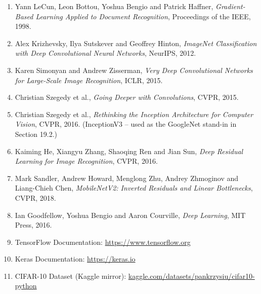 \documentclass[11pt]{article}
\begin{document}
\begin{enumerate}

\item Yann LeCun, Leon Bottou, Yoshua Bengio and Patrick Haffner,
\emph{Gradient-Based Learning Applied to Document Recognition},
Proceedings of the IEEE, 1998.

\item Alex Krizhevsky, Ilya Sutskever and Geoffrey Hinton,
\emph{ImageNet Classification with Deep Convolutional Neural Networks},
NeurIPS, 2012.

\item Karen Simonyan and Andrew Zisserman,
\emph{Very Deep Convolutional Networks for Large-Scale Image Recognition},
ICLR, 2015.

\item Christian Szegedy et al.,
\emph{Going Deeper with Convolutions},
CVPR, 2015.

\item Christian Szegedy et al.,
\emph{Rethinking the Inception Architecture for Computer Vision},
CVPR, 2016. (InceptionV3 -- used as the GoogleNet stand-in in Section 19.2.)

\item Kaiming He, Xiangyu Zhang, Shaoqing Ren and Jian Sun,
\emph{Deep Residual Learning for Image Recognition},
CVPR, 2016.

\item Mark Sandler, Andrew Howard, Menglong Zhu, Andrey Zhmoginov and
Liang-Chieh Chen,
\emph{MobileNetV2: Inverted Residuals and Linear Bottlenecks},
CVPR, 2018.

\item Ian Goodfellow, Yoshua Bengio and Aaron Courville,
\emph{Deep Learning},
MIT Press, 2016.

\item TensorFlow Documentation:
\url{https://www.tensorflow.org}

\item Keras Documentation:
\url{https://keras.io}

\item CIFAR-10 Dataset (Kaggle mirror):
\href{https://www.kaggle.com/datasets/pankrzysiu/cifar10-python}{kaggle.com/datasets/pankrzysiu/cifar10-python}

\end{enumerate}

\end{document}
